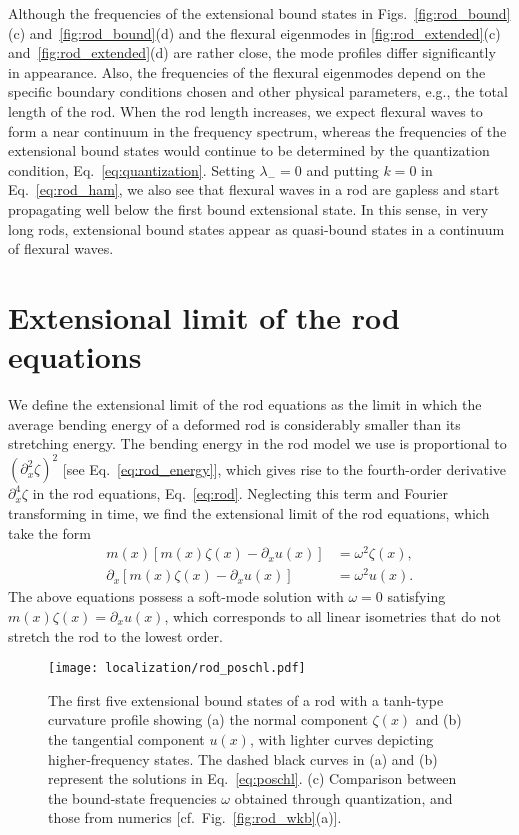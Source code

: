 Although the frequencies of the extensional bound states in Figs.~\ref{fig:rod_bound}(c) and~\ref{fig:rod_bound}(d) and the flexural eigenmodes in \ref{fig:rod_extended}(c) and~\ref{fig:rod_extended}(d) are rather close, the mode profiles differ significantly in appearance.
Also, the frequencies of the flexural eigenmodes depend on the specific boundary conditions chosen and other physical parameters, e.g., the total length of the rod.
When the rod length increases, we expect flexural waves to form a near continuum in the frequency spectrum, whereas the frequencies of the extensional bound states would continue to be determined by the quantization condition, Eq.~\eqref{eq:quantization}.
Setting $\lambda_{-} = 0$ and putting $k = 0$ in Eq.~\eqref{eq:rod_ham}, we also see that flexural waves in a rod are gapless and start propagating well below the first bound extensional state.
In this sense, in very long rods, extensional bound states appear as quasi-bound states in a continuum of flexural waves.

\section{Extensional limit of the rod equations}
\label{sec:extensional_limit}

We define the extensional limit of the rod equations as the limit in which the average bending energy of a deformed rod is considerably smaller than its stretching energy.
The bending energy in the rod model we use is proportional to $(\partial_{x}^{2} \zeta)^{2}$ [see Eq.~\eqref{eq:rod_energy}], which gives rise to the fourth-order derivative $\partial_x^{4}\zeta$ in the rod equations, Eq.~\eqref{eq:rod}.
Neglecting this term and Fourier transforming in time, we find the extensional limit of the rod equations, which take the form
%
\begin{subequations}
  \begin{align}
  \label{eq:rod_ext1}
  m(x)\left[m(x)\zeta(x) - \partial_{x}u(x)\right] &= \omega^{2}\zeta(x),\\
  \partial_{x}\left[m(x)\zeta(x) - \partial_{x}u(x)\right] &= \omega^{2}u(x).
  \label{eq:rod_ext2}
  \end{align}
\end{subequations}
%
The above equations possess a soft-mode solution with $\omega = 0$ satisfying $m(x)\zeta(x) = \partial_{x}u(x)$, which corresponds to all linear isometries that do not stretch the rod to the lowest order.
%
\begin{figure}
  \begin{center}
    \texttt{[image: localization/rod\_poschl.pdf]}
  \end{center}
  \caption{%
    The first five extensional bound states of a rod with a tanh-type curvature profile showing (a) the normal component $\zeta(x)$ and (b) the tangential component $u(x)$, with lighter curves depicting higher-frequency states.
    The dashed black curves in (a) and (b) represent the solutions in Eq.~\eqref{eq:poschl}.
    (c) Comparison between the bound-state frequencies $\omega$ obtained through quantization, and those from numerics [cf.~Fig.~\ref{fig:rod_wkb}(a)].
  }
  \label{fig:poschl}
\end{figure}

